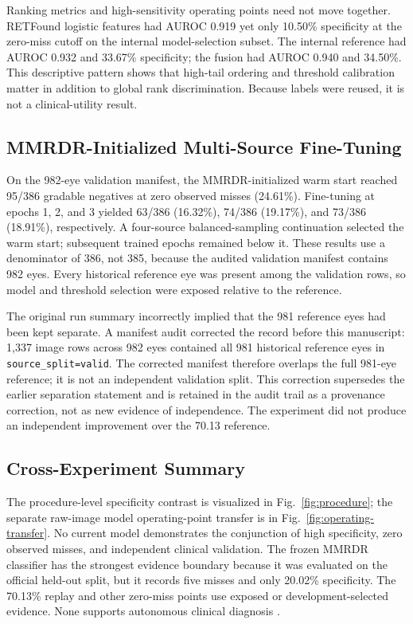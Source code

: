 \documentclass{ieeeaccess}
\begin{document}
Ranking metrics and high-sensitivity operating points need not move together. RETFound logistic features had AUROC 0.919 yet only 10.50\% specificity at the zero-miss cutoff on the internal model-selection subset. The internal reference had AUROC 0.932 and 33.67\% specificity; the fusion had AUROC 0.940 and 34.50\%. This descriptive pattern shows that high-tail ordering and threshold calibration matter in addition to global rank discrimination. Because labels were reused, it is not a clinical-utility result.

\subsection{MMRDR-Initialized Multi-Source Fine-Tuning}
On the 982-eye validation manifest, the MMRDR-initialized warm start reached 95/386 gradable negatives at zero observed misses (24.61\%). Fine-tuning at epochs 1, 2, and 3 yielded 63/386 (16.32\%), 74/386 (19.17\%), and 73/386 (18.91\%), respectively. A four-source balanced-sampling continuation selected the warm start; subsequent trained epochs remained below it. These results use a denominator of 386, not 385, because the audited validation manifest contains 982 eyes. Every historical reference eye was present among the validation rows, so model and threshold selection were exposed relative to the reference.

The original run summary incorrectly implied that the 981 reference eyes had been kept separate. A manifest audit corrected the record before this manuscript: 1,337 image rows across 982 eyes contained all 981 historical reference eyes in \texttt{source\_split=valid}. The corrected manifest therefore overlaps the full 981-eye reference; it is not an independent validation split. This correction supersedes the earlier separation statement and is retained in the audit trail as a provenance correction, not as new evidence of independence. The experiment did not produce an independent improvement over the 70.13 reference.

\subsection{Cross-Experiment Summary}
The procedure-level specificity contrast is visualized in Fig.~\ref{fig:procedure}; the separate raw-image model operating-point transfer is in Fig.~\ref{fig:operating-transfer}. No current model demonstrates the conjunction of high specificity, zero observed misses, and independent clinical validation. The frozen MMRDR classifier has the strongest evidence boundary because it was evaluated on the official held-out split, but it records five misses and only 20.02\% specificity. The 70.13\% replay and other zero-miss points use exposed or development-selected evidence. None supports autonomous clinical diagnosis \cite{openaiChatGPT}.
\end{document}
